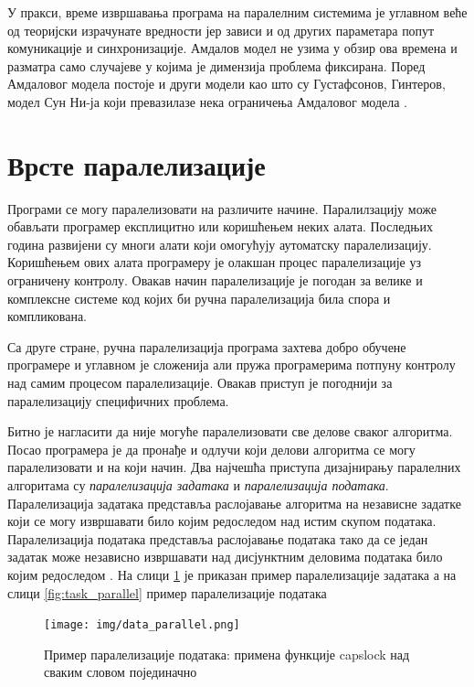 \documentclass[12pt,oneside]{memoir}
\begin{document}
 У пракси, време извршавања програма на паралелним системима је углавном веће од теоријски израчунате вредности јер зависи и од других параметара попут комуникације и синхронизације. Амдалов модел не узима у обзир ова времена и разматра само случајеве у којима је димензија проблема фиксирана. Поред Амдаловог модела постоје и други модели као што су Густафсонов, Гинтеров, модел Сун Ни-ја који превазилазе нека ограничења Амдаловог модела \cite{performance}.
 	 


  \section{Врсте паралелизације}
  
 Програми се могу паралелизовати на различите начине. Паралилзацију може обављати програмер експлицитно или коришћењем неких алата. Последњих година развијени су многи алати који омогућују аутоматску паралелизацију. Коришћењем ових алата програмеру је олакшан процес паралелизације уз ограничену контролу. Овакав начин паралелизације је погодан за велике и комплексне системе код којих би ручна паралелизација била спора и компликована.
 
  Са друге стране, ручна паралелизација програма захтева добро обучене програмере и углавном је сложенија али пружа програмерима потпуну контролу над самим процесом паралелизације. Овакав приступ је погоднији за паралелизацију специфичних проблема.


  Битно је нагласити да није могуће паралелизовати све делове сваког алгоритма. Посао програмера је да пронађе и одлучи који делови алгоритма се могу паралелизовати и на који начин.
 Два најчешћа приступа дизајнирању паралелних алгоритама су \emph{паралелизација задатака} и \emph{паралелизација података}. 
Паралелизација задатака представља раслојавање алгоритма на независне задатке који се могу извршавати било којим редоследом над истим скупом података.
Паралелизација података представља раслојавање података тако да се један задатак може независно извршавати над дисјунктним деловима података било којим редоследом \cite{art_conc}. 
На слици  \ref{fig:data_parallel} је приказан пример паралелизације задатака а на слици \ref{fig:task_parallel} пример паралелизације података

\begin{figure}[!ht]
  \centering
  \texttt{[image: img/data\_parallel.png]}
  \caption{Пример паралелизације података: примена функције capslock над сваким словом појединачно}
  \label{fig:data_parallel}
\end{figure}
\end{document}
